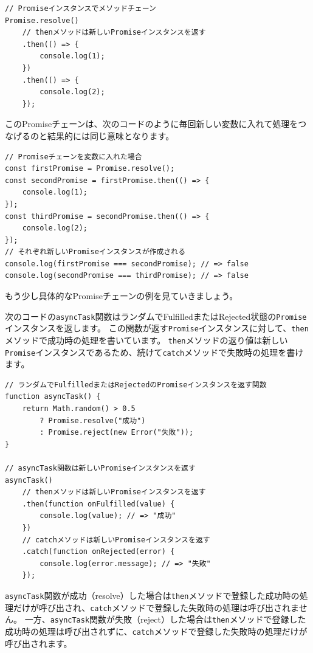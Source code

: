 \begin{lstlisting}
// Promiseインスタンスでメソッドチェーン
Promise.resolve()
    // thenメソッドは新しいPromiseインスタンスを返す
    .then(() => {
        console.log(1);
    })
    .then(() => {
        console.log(2);
    });
\end{lstlisting}

このPromiseチェーンは、次のコードのように毎回新しい変数に入れて処理をつなげるのと結果的には同じ意味となります。

\begin{lstlisting}
// Promiseチェーンを変数に入れた場合
const firstPromise = Promise.resolve();
const secondPromise = firstPromise.then(() => {
    console.log(1);
});
const thirdPromise = secondPromise.then(() => {
    console.log(2);
});
// それぞれ新しいPromiseインスタンスが作成される
console.log(firstPromise === secondPromise); // => false
console.log(secondPromise === thirdPromise); // => false
\end{lstlisting}

もう少し具体的なPromiseチェーンの例を見ていきましょう。

次のコードの\texttt{asyncTask}関数はランダムでFulfilledまたはRejected状態の\texttt{Promise}インスタンスを返します。
この関数が返す\texttt{Promise}インスタンスに対して、\texttt{then}メソッドで成功時の処理を書いています。
\texttt{then}メソッドの返り値は新しい\texttt{Promise}インスタンスであるため、続けて\texttt{catch}メソッドで失敗時の処理を書けます。

\begin{lstlisting}
// ランダムでFulfilledまたはRejectedのPromiseインスタンスを返す関数
function asyncTask() {
    return Math.random() > 0.5 
        ? Promise.resolve("成功")
        : Promise.reject(new Error("失敗"));
}

// asyncTask関数は新しいPromiseインスタンスを返す
asyncTask()
    // thenメソッドは新しいPromiseインスタンスを返す
    .then(function onFulfilled(value) {　
        console.log(value); // => "成功"
    })
    // catchメソッドは新しいPromiseインスタンスを返す
    .catch(function onRejected(error) {
        console.log(error.message); // => "失敗"
    });
\end{lstlisting}

\texttt{asyncTask}関数が成功（resolve）した場合は\texttt{then}メソッドで登録した成功時の処理だけが呼び出され、\texttt{catch}メソッドで登録した失敗時の処理は呼び出されません。
一方、\texttt{asyncTask}関数が失敗（reject）した場合は\texttt{then}メソッドで登録した成功時の処理は呼び出されずに、\texttt{catch}メソッドで登録した失敗時の処理だけが呼び出されます。

